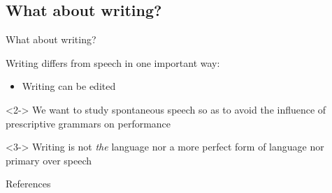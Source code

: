 \documentclass{beamer}
\newcommand{\subtwoseven}{What about writing?}
\begin{document}
    \subsection{\subtwoseven}
      \begin{frame}{\subtwoseven}
        \begin{block}{}
          Writing differs from speech in one important way:
          \begin{itemize}
            \item Writing can be edited
          \end{itemize}
        \end{block}
        \begin{block}<2->{}
          We want to study spontaneous speech so as to avoid the influence of prescriptive grammars on performance
        \end{block}
        \begin{alertblock}<3->{}
          Writing is not \emph{the} language nor a more perfect form of language nor primary over speech
        \end{alertblock}
      \end{frame}

  \begin{frame}{References}
    \printbibliography
  \end{frame}
\end{document}
